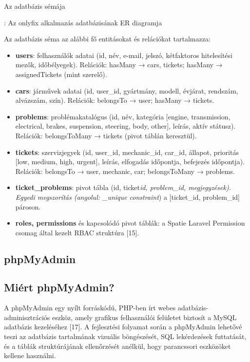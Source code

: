 Az adatbázis sémája

: Az onlyfix alkalmazás adatbázisának ER diagramja

Az adatbázis séma az alábbi fő entitásokat és relációkat tartalmazza:

\begin{itemize}
\item
  \textbf{users}: felhasználók adatai (id, név, e-mail, jelszó, kétfaktoros hitelesítési mezők, időbélyegek). Relációk: hasMany → cars, tickets; hasMany → assignedTickets (mint szerelő).
\item
  \textbf{cars}: járművek adatai (id, user\_id, gyártmány, modell, évjárat, rendszám, alvázszám, szín). Relációk: belongsTo → user; hasMany → tickets.
\item
  \textbf{problems}: problémakatalógus (id, név, kategória {[}engine, transmission, electrical, brakes, suspension, steering, body, other{]}, leírás, aktív státusz). Relációk: belongsToMany → tickets (pivot táblán keresztül).
\item
  \textbf{tickets}: szervizjegyek (id, user\_id, mechanic\_id, car\_id, állapot, prioritás {[}low, medium, high, urgent{]}, leírás, elfogadás időpontja, befejezés időpontja). Relációk: belongsTo → user, mechanic, car; belongsToMany → problems.
\item
  \textbf{ticket\_problems}: pivot tábla (id, ticket\emph{id, problem\_id, megjegyzések). Egyedi megszorítás (angolul: \_unique constraint}) a {[}ticket\_id, problem\_id{]} pároson.
\item
  \textbf{roles, permissions} és kapcsolódó pivot táblák: a Spatie Laravel Permission csomag által kezelt RBAC struktúra {[}15{]}.
\end{itemize}

\subsection{phpMyAdmin}\label{phpmyadmin}

\subsection{Miért phpMyAdmin?}\label{miuxe9rt-phpmyadmin}

A phpMyAdmin egy nyílt forráskódú, PHP-ben írt webes adatbázis-adminisztrációs eszköz, amely grafikus felhasználói felületet biztosít a MySQL adatbázis kezeléséhez {[}17{]}. A fejlesztési folyamat során a phpMyAdmin lehetővé teszi az adatbázis tartalmának vizuális böngészését, SQL lekérdezések futtatását, és a táblák struktúrájának ellenőrzését anélkül, hogy parancssori eszközöket kellene használni.

